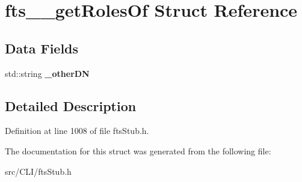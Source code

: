 \section{fts\_\-\_\-getRolesOf Struct Reference}
\label{structfts____getRolesOf}
\subsection*{Data Fields}
\begin{DoxyCompactItemize}
\item 
std::string {\bfseries \_\-otherDN}\label{structfts____getRolesOf_adec9c58721fbd756c92b803b975d7a08}

\end{DoxyCompactItemize}


\subsection{Detailed Description}


Definition at line 1008 of file ftsStub.h.



The documentation for this struct was generated from the following file:\begin{DoxyCompactItemize}
\item 
src/CLI/ftsStub.h\end{DoxyCompactItemize}
